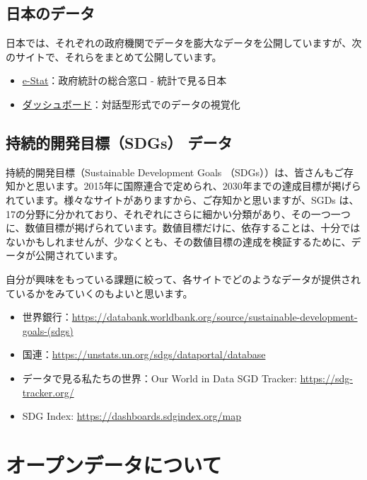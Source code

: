 \documentclass[
  xelatex, ja=standard]{bxjsbook}
\providecommand{\tightlist}{%
  \setlength{\itemsep}{0pt}\setlength{\parskip}{0pt}}
\theoremstyle{definition}
\theoremstyle{definition}
\theoremstyle{definition}
\theoremstyle{definition}
\theoremstyle{remark}
\begin{document}
\hypertarget{ux65e5ux672cux306eux30c7ux30fcux30bf}{%
\subsection{日本のデータ}\label{ux65e5ux672cux306eux30c7ux30fcux30bf}}

日本では、それぞれの政府機関でデータを膨大なデータを公開していますが、次のサイトで、それらをまとめて公開しています。

\begin{itemize}
\tightlist
\item
  \href{https://www.e-stat.go.jp/}{e-Stat}：政府統計の総合窓口 - 統計で見る日本
\item
  \href{https://dashboard.e-stat.go.jp}{ダッシュボード}：対話型形式でのデータの視覚化
\end{itemize}

\hypertarget{ux6301ux7d9aux7684ux958bux767aux76eeux6a19sdgs-ux30c7ux30fcux30bf}{%
\subsection{持続的開発目標（SDGs） データ}\label{ux6301ux7d9aux7684ux958bux767aux76eeux6a19sdgs-ux30c7ux30fcux30bf}}

持続的開発目標（Sustainable Development Goals （SDGs））は、皆さんもご存知かと思います。2015年に国際連合で定められ、2030年までの達成目標が掲げられています。様々なサイトがありますから、ご存知かと思いますが、SGDs は、17の分野に分かれており、それぞれにさらに細かい分類があり、その一つ一つに、数値目標が掲げられています。数値目標だけに、依存することは、十分ではないかもしれませんが、少なくとも、その数値目標の達成を検証するために、データが公開されています。

自分が興味をもっている課題に絞って、各サイトでどのようなデータが提供されているかをみていくのもよいと思います。

\begin{itemize}
\tightlist
\item
  世界銀行：\url{https://databank.worldbank.org/source/sustainable-development-goals-(sdgs)}
\item
  国連：\url{https://unstats.un.org/sdgs/dataportal/database}
\item
  データで見る私たちの世界：Our World in Data SGD Tracker: \url{https://sdg-tracker.org/}
\item
  SDG Index: \url{https://dashboards.sdgindex.org/map}
\end{itemize}

\hypertarget{ux30aaux30fcux30d7ux30f3ux30c7ux30fcux30bfux306bux3064ux3044ux3066}{%
\section{オープンデータについて}\label{ux30aaux30fcux30d7ux30f3ux30c7ux30fcux30bfux306bux3064ux3044ux3066}}
\end{document}
